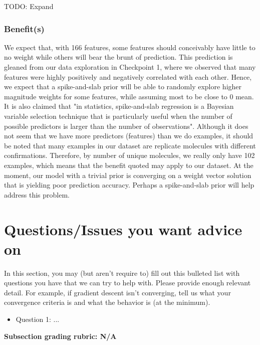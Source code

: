 \documentclass[12pt]{extarticle}
\begin{document}
TODO: Expand

\subsubsection{Benefit(s)}

We expect that, with 166 features, some features should conceivably have little to no weight while others will bear the brunt of prediction. This prediction is gleaned from our data exploration in Checkpoint 1, where we observed that many features were highly positively and negatively correlated with each other. Hence, we expect that a spike-and-slab prior will be able to randomly explore higher magnitude weights for some features, while assuming most to be close to 0 mean. It is also claimed that "in statistics, spike-and-slab regression is a Bayesian variable selection technique that is particularly useful when the number of possible predictors is larger than the number of observations". Although it does not seem that we have more predictors (features) than we do examples, it should be noted that many examples in our dataset are replicate molecules with different confirmations. Therefore, by number of unique molecules, we really only have 102 examples, which means that the benefit quoted may apply to our dataset. At the moment, our model with a trivial prior is converging on a weight vector solution that is yielding poor prediction accuracy. Perhaps a spike-and-slab prior will help address this problem.

\section{Questions/Issues you want advice on}

In this section, you may (but aren't require to) fill out this bulleted list with questions you have that we can try to help with.  Please provide enough relevant detail.  For example, if gradient descent isn't converging, tell us what your convergence criteria is and what the behavior is (at the minimum).

\begin{itemize}
	\item Question 1: ...
\end{itemize}

\textbf{Subsection grading rubric: N/A}
\end{document}
